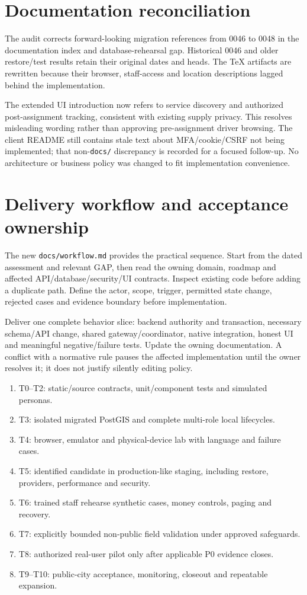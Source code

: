 \documentclass[11pt,a4paper]{article}
\newcommand{\src}[1]{{\small\nolinkurl{#1}}}
\begin{document}
\section{Documentation reconciliation}
The audit corrects forward-looking migration references from 0046 to 0048 in
the documentation index and database-rehearsal gap. Historical 0046 and older
restore/test results retain their original dates and heads. The TeX artifacts
are rewritten because their browser, staff-access and location descriptions
lagged behind the implementation.

The extended UI introduction now refers to service discovery and authorized
post-assignment tracking, consistent with existing supply privacy. This resolves
misleading wording rather than approving pre-assignment driver browsing. The
client README still contains stale text about MFA/cookie/CSRF not being
implemented; that non-\src{docs/} discrepancy is recorded for a focused follow-up.
No architecture or business policy was changed to fit implementation convenience.

\section{Delivery workflow and acceptance ownership}
The new \src{docs/workflow.md} provides the practical sequence. Start from the
dated assessment and relevant GAP, then read the owning domain, roadmap and
affected API/database/security/UI contracts. Inspect existing code before adding
a duplicate path. Define the actor, scope, trigger, permitted state change,
rejected cases and evidence boundary before implementation.

Deliver one complete behavior slice: backend authority and transaction, necessary
schema/API change, shared gateway/coordinator, native integration, honest UI and
meaningful negative/failure tests. Update the owning documentation. A conflict
with a normative rule pauses the affected implementation until the owner resolves
it; it does not justify silently editing policy.

\begin{enumerate}
\item T0--T2: static/source contracts, unit/component tests and simulated personas.
\item T3: isolated migrated PostGIS and complete multi-role local lifecycles.
\item T4: browser, emulator and physical-device lab with language and failure cases.
\item T5: identified candidate in production-like staging, including restore,
providers, performance and security.
\item T6: trained staff rehearse synthetic cases, money controls, paging and recovery.
\item T7: explicitly bounded non-public field validation under approved safeguards.
\item T8: authorized real-user pilot only after applicable P0 evidence closes.
\item T9--T10: public-city acceptance, monitoring, closeout and repeatable expansion.
\end{enumerate}
\end{document}
